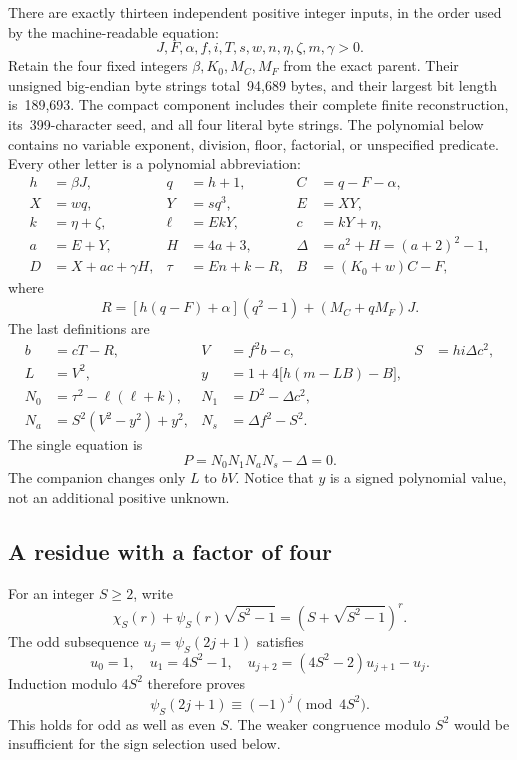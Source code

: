 There are exactly thirteen independent positive integer inputs,
in the order used by the machine-readable equation:
\[
 J,F,\alpha,f,i,T,s,w,n,\eta,\zeta,m,\gamma>0.
\]
Retain the four fixed integers $\beta,K_0,M_C,M_F$ from the exact parent.
Their unsigned big-endian byte strings total~94,689 bytes, and their
largest bit length is~189,693.  The compact component includes their complete
finite reconstruction, its~399-character seed, and all four literal
byte strings.  The polynomial below contains no variable exponent,
division, floor, factorial, or unspecified predicate.  Every other letter
is a polynomial abbreviation:
\begin{align*}
 h&=\beta J,& q&=h+1,& C&=q-F-\alpha,\\
 X&=wq,&Y&=sq^3,&E&=XY,\\
 k&=\eta+\zeta,&\ell&=EkY,&c&=kY+\eta,\\
 a&=E+Y,&H&=4a+3,&\Delta&=a^2+H=(a+2)^2-1,\\
 D&=X+ac+\gamma H,&\tau&=En+k-R,&B&=(K_0+w)C-F,
\end{align*}
where
\[
 R=[h(q-F)+\alpha](q^2-1)+(M_C+qM_F)J.
\]
The last definitions are
\begin{align*}
 b&=cT-R,& V&=f^2b-c,&S&=hi\Delta c^2,\\
 L&=V^2,& y&=1+4\bigl[h(m-LB)-B\bigr],\\
 N_0&=\tau^2-\ell(\ell+k),&
 N_1&=D^2-\Delta c^2,\\
 N_a&=S^2(V^2-y^2)+y^2,&
 N_s&=\Delta f^2-S^2.
\end{align*}
The single equation is
\begin{equation}
 \boxed{P=N_0N_1N_aN_s-\Delta=0.}
 \label{eq:second-carrier}
\end{equation}
The companion changes only $L$ to $bV$.  Notice that $y$ is a signed
polynomial value, not an additional positive unknown.

\subsection{A residue with a factor of four}

For an integer $S\ge2$, write
\[
 \chi_S(r)+\psi_S(r)\sqrt{S^2-1}
   =(S+\sqrt{S^2-1})^r.
\]
The odd subsequence $u_j=\psi_S(2j+1)$ satisfies
\[
 u_0=1,\quad u_1=4S^2-1,\quad
 u_{j+2}=(4S^2-2)u_{j+1}-u_j.
\]
Induction modulo $4S^2$ therefore proves
\begin{equation}
 \psi_S(2j+1)\equiv(-1)^j\pmod{4S^2}.
 \label{eq:odd-four-residue}
\end{equation}
This holds for odd as well as even $S$.  The weaker congruence modulo
$S^2$ would be insufficient for the sign selection used below.

